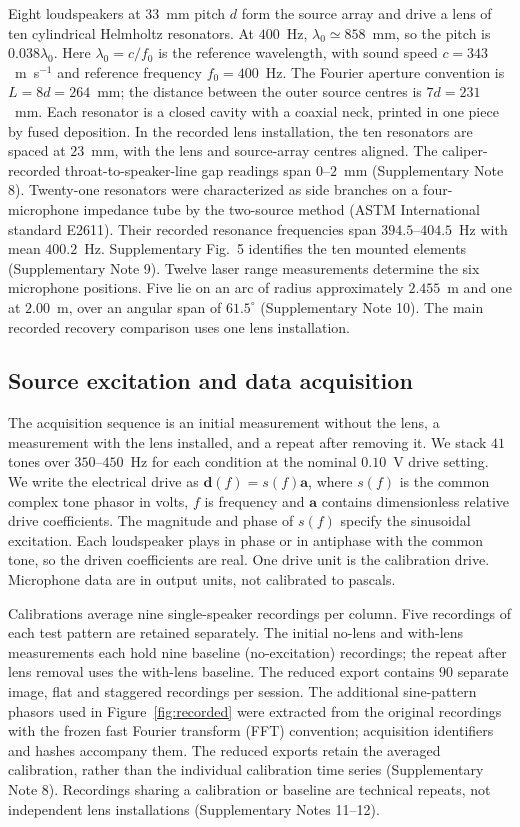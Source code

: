 \documentclass[lineno,pdflatex,sn-nature]{sn-jnl}%
\theoremstyle{thmstyleone}%
\theoremstyle{thmstyletwo}%
\theoremstyle{thmstylethree}%
\begin{document}
Eight loudspeakers at $33$~mm pitch $d$ form the source array and drive a lens of ten cylindrical Helmholtz resonators. At $400$~Hz, $\lambda_0\simeq858$~mm, so the pitch is $0.038\lambda_0$. Here $\lambda_0=c/f_0$ is the reference wavelength, with sound speed $c=343$~m~s$^{-1}$ and reference frequency $f_0=400$~Hz. The Fourier aperture convention is $L=8d=264$~mm; the distance between the outer source centres is $7d=231$~mm. Each resonator is a closed cavity with a coaxial neck, printed in one piece by fused deposition. In the recorded lens installation, the ten resonators are spaced at $23$~mm, with the lens and source-array centres aligned. The caliper-recorded throat-to-speaker-line gap readings span $0$--$2$~mm (Supplementary Note 8). Twenty-one resonators were characterized as side branches on a four-microphone impedance tube by the two-source method (ASTM International standard E2611). Their recorded resonance frequencies span $394.5$--$404.5$~Hz with mean $400.2$~Hz. Supplementary Fig.~5 identifies the ten mounted elements (Supplementary Note 9). Twelve laser range measurements determine the six microphone positions. Five lie on an arc of radius approximately $2.455$~m and one at $2.00$~m, over an angular span of $61.5^\circ$ (Supplementary Note 10). The main recorded recovery comparison uses one lens installation.


\subsection{Source excitation and data acquisition}

The acquisition sequence is an initial measurement without the lens, a measurement with the lens installed, and a repeat after removing it. We stack $41$ tones over $350$--$450$~Hz for each condition at the nominal $0.10$~V drive setting. We write the electrical drive as $\mathbf d(f)=s(f)\mathbf a$, where $s(f)$ is the common complex tone phasor in volts, $f$ is frequency and $\mathbf a$ contains dimensionless relative drive coefficients. The magnitude and phase of $s(f)$ specify the sinusoidal excitation. Each loudspeaker plays in phase or in antiphase with the common tone, so the driven coefficients are real. One drive unit is the calibration drive. Microphone data are in output units, not calibrated to pascals.


Calibrations average nine single-speaker recordings per column. Five recordings of each test pattern are retained separately. The initial no-lens and with-lens measurements each hold nine baseline (no-excitation) recordings; the repeat after lens removal uses the with-lens baseline. The reduced export contains $90$ separate image, flat and staggered recordings per session. The additional sine-pattern phasors used in Figure~\ref{fig:recorded} were extracted from the original recordings with the frozen fast Fourier transform (FFT) convention; acquisition identifiers and hashes accompany them. The reduced exports retain the averaged calibration, rather than the individual calibration time series (Supplementary Note 8). Recordings sharing a calibration or baseline are technical repeats, not independent lens installations (Supplementary Notes 11--12).
\end{document}
